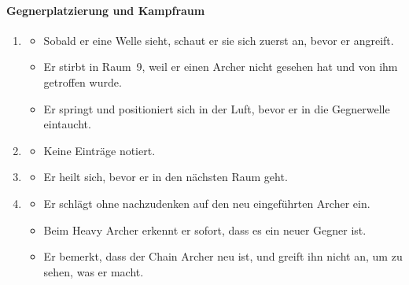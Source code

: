 \documentclass[../Main.tex]{subfiles}
\begin{document}
\paragraph{Gegnerplatzierung und Kampfraum}
\begin{enumerate}[label=\textbf{B\arabic*}, leftmargin=1.5cm, itemsep=0.8em, resume]
\item
\begin{itemize}[nosep]
    \item Sobald er eine Welle sieht, schaut er sie sich zuerst an, bevor er angreift.
    \item Er stirbt in Raum~9, weil er einen Archer nicht gesehen hat und von ihm getroffen wurde.
    \item Er springt und positioniert sich in der Luft, bevor er in die Gegnerwelle eintaucht.
\end{itemize}
\item
\begin{itemize}[nosep]
    \item Keine Einträge notiert.
\end{itemize}
\item
\begin{itemize}[nosep]
    \item Er heilt sich, bevor er in den nächsten Raum geht.
\end{itemize}
\item
\begin{itemize}[nosep]
    \item Er schlägt ohne nachzudenken auf den neu eingeführten Archer ein.
    \item Beim Heavy Archer erkennt er sofort, dass es ein neuer Gegner ist.
    \item Er bemerkt, dass der Chain Archer neu ist, und greift ihn nicht an, um zu sehen, was er macht.
\end{itemize}
\end{enumerate}
\end{document}
